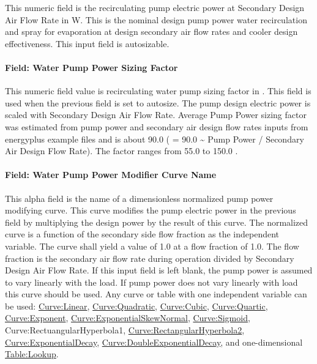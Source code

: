 This numeric field is the recirculating pump electric power at Secondary Design Air Flow Rate in W. This is the nominal design pump power water recirculation and spray for evaporation at design secondary air flow rates and cooler design effectiveness. This input field is autosizable.

\paragraph{Field: Water Pump Power Sizing Factor}\label{field-water-pump-power-sizing-factor-1}

This numeric field value is recirculating water pump sizing factor in \si{\wattperVolumeFlowRate}. This field is used when the previous field is set to autosize. The pump design electric power is scaled with Secondary Design Air Flow Rate. Average Pump Power sizing factor was estimated from pump power and secondary air design flow rates inputs from energyplus example files and is about 90.0 \si{\wattperVolumeFlowRate} ( = 90.0 \textasciitilde{} Pump Power / Secondary Air Design Flow Rate). The factor ranges from 55.0 to 150.0 \si{\wattperVolumeFlowRate}.

\paragraph{Field: Water Pump Power Modifier Curve Name}\label{field-water-pump-power-modifier-curve-name-1}

This alpha field is the name of a dimensionless normalized pump power modifying curve. This curve modifies the pump electric power in the previous field by multiplying the design power by the result of this curve. The normalized curve is a function of the secondary side flow fraction as the independent variable. The curve shall yield a value of 1.0 at a flow fraction of 1.0. The flow fraction is the secondary air flow rate during operation divided by Secondary Design Air Flow Rate. If this input field is left blank, the pump power is assumed to vary linearly with the load. If pump power does not vary linearly with load this curve should be used. Any curve or table with one independent variable can be used: \hyperref[curvelinear]{Curve:Linear}, \hyperref[curvequadratic]{Curve:Quadratic}, \hyperref[curvecubic]{Curve:Cubic}, \hyperref[curvequartic]{Curve:Quartic}, \hyperref[curveexponent]{Curve:Exponent}, \hyperref[curveexponentialskewnormal]{Curve:ExponentialSkewNormal}, \hyperref[curvesigmoid]{Curve:Sigmoid}, Curve:RectuangularHyperbola1, \hyperref[curverectangularhyperbola2]{Curve:RectangularHyperbola2}, \hyperref[curveexponentialdecay]{Curve:ExponentialDecay}, \hyperref[curvedoubleexponentialdecay]{Curve:DoubleExponentialDecay}, and one-dimensional \hyperref[tablelookup]{Table:Lookup}.

